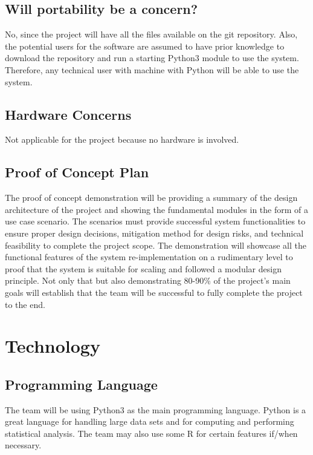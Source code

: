 \documentclass{article}
\begin{document}
\subsection{Will portability be a concern?}
No, since the project will have all the files available on the git repository. Also, the potential users for the software are assumed to have prior knowledge to download the repository and run a starting Python3 module to use the system. Therefore, any technical user with machine with Python will be able to use the system.

\subsection{Hardware Concerns}
Not applicable for the project because no hardware is involved. 

\subsection{Proof of Concept Plan}
The proof of concept demonstration will be providing a summary of the design architecture of the project and showing the fundamental modules in the form of a use case scenario. The scenarios must provide successful system functionalities to ensure proper design decisions, mitigation method for design risks, and technical feasibility to complete the project scope. The demonstration will showcase all the functional features of the system re-implementation on a rudimentary level to proof that the system is suitable for scaling and followed a modular design principle. Not only that but also demonstrating 80-90\% of the project's main goals will establish that the team will be successful to fully complete the project to the end.



\section{Technology}%

\subsection{Programming Language}
The team will be using Python3 as the main programming language. Python is a great language for handling large data sets and for computing and performing statistical analysis. The team may also use some R for certain features if/when necessary.
\end{document}
